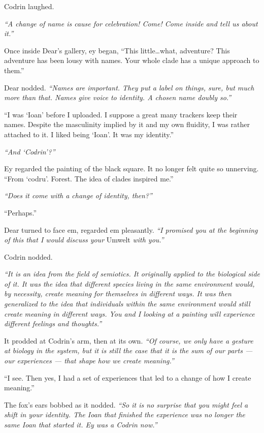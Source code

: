 Codrin laughed.

\emph{``A change of name is cause for celebration! Come! Come inside and tell us about it.''}

Once inside Dear's gallery, ey began, ``This little\ldots{}what, adventure? This adventure has been lousy with names. Your whole clade has a unique approach to them.''

Dear nodded. \emph{``Names are important. They put a label on things, sure, but much more than that. Names give voice to identity. A chosen name doubly so.''}

``I was `Ioan' before I uploaded. I suppose a great many trackers keep their names. Despite the masculinity implied by it and my own fluidity, I was rather attached to it. I liked being `Ioan'. It was my identity.''

\emph{``And `Codrin'?''}

Ey regarded the painting of the black square. It no longer felt quite so unnerving. ``From `codru'. Forest. The idea of clades inspired me.''

\emph{``Does it come with a change of identity, then?''}

``Perhaps.''

Dear turned to face em, regarded em pleasantly. \emph{``I promised you at the beginning of this that I would discuss your} Umwelt \emph{with you.''}

Codrin nodded.

\emph{``It is an idea from the field of semiotics. It originally applied to the biological side of it. It was the idea that different species living in the same environment would, by necessity, create meaning for themselves in different ways. It was then generalized to the idea that individuals within the same environment would still create meaning in different ways. You and I looking at a painting will experience different feelings and thoughts.''}

It prodded at Codrin's arm, then at its own. \emph{``Of course, we only have a gesture at biology in the system, but it is still the case that it is the sum of our parts — our experiences — that shape how we create meaning.''}

``I see. Then yes, I had a set of experiences that led to a change of how I create meaning.''

The fox's ears bobbed as it nodded. \emph{``So it is no surprise that you might feel a shift in your identity. The Ioan that finished the experience was no longer the same Ioan that started it. Ey was a Codrin now.''}

